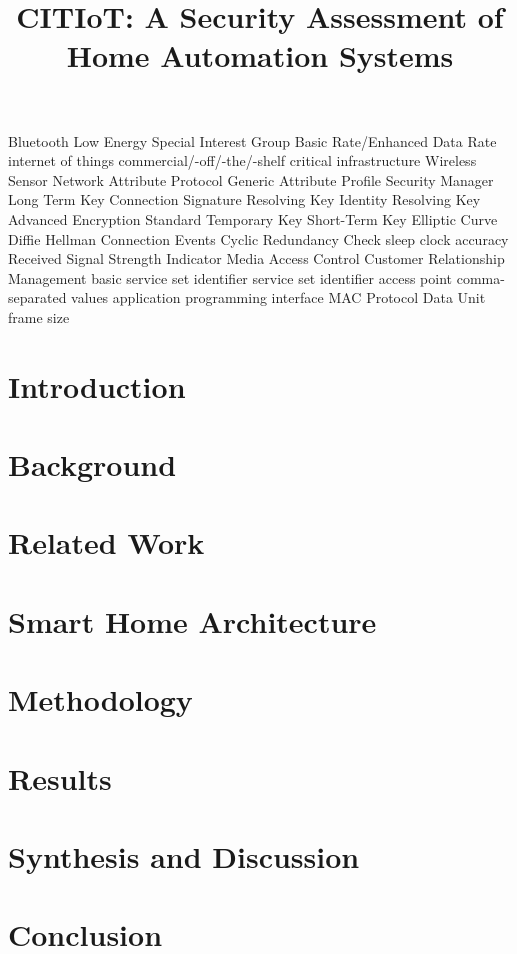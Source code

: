 \documentclass[12pt,letterpaper,oneside]{book}
\begin{document}
	\begin{acronym}
		 {Bluetooth Low Energy}
		 {Special Interest Group}
		 {Basic Rate/Enhanced Data Rate}
		 {internet of things}
		 {commercial/-off/-the/-shelf}
		 {critical infrastructure}
		 {Wireless Sensor Network}
		 {Attribute Protocol}
		 {Generic Attribute Profile}
		 {Security Manager}
		 {Long Term Key}
		 {Connection Signature Resolving Key}
		 {Identity Resolving Key}
		 {Advanced Encryption Standard}
		 {Temporary Key}
		 {Short-Term Key}
		 {Elliptic Curve Diffie Hellman}
		 {Connection Events}
		 {Cyclic Redundancy Check}
		 {sleep clock accuracy}
		 {Received Signal Strength Indicator}
		 {Media Access Control}
		 {Customer Relationship Management}
		 {basic service set identifier}
		 {service set identifier}
		 {access point}
		 {comma-separated values}
		 {application programming interface}
		 {MAC Protocol Data Unit}
		 {frame size}
	\end{acronym}
\title{CITIoT: A Security Assessment of Home Automation Systems}
\mainmatter
	\section{Introduction} \label{introduction}
		
	\section{Background} \label{background}
		
	\section{Related Work} \label{relatedWork}
		
	\section{Smart Home Architecture} \label{smartHome}
		
	\section{Methodology} \label{methodology}
		
	\section{Results} \label{results}
		
	\section{Synthesis and Discussion} \label{synthesis}
		
	\section{Conclusion} \label{conclusion}
		
	\newpage
		
\backmatter
	\singlespace
	
	 
	\clearpage
\end{document}
